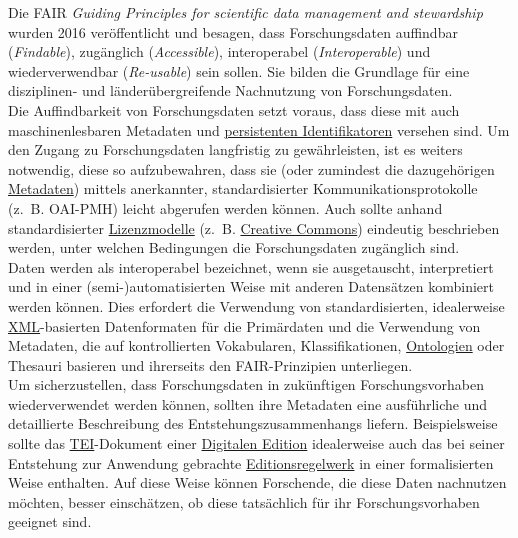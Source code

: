 \documentclass{article}
\begin{document}
    Die FAIR \emph{Guiding Principles for scientific data management and stewardship} wurden 2016 veröffentlicht und besagen, dass Forschungsdaten auffindbar (\emph{Findable}), zugänglich (\emph{Accessible}), interoperabel (\emph{Interoperable}) und wiederverwendbar (\emph{Re-usable}) sein sollen. Sie bilden die Grundlage für eine disziplinen- und länderübergreifende Nachnutzung von Forschungsdaten. \\
            
        Die Auffindbarkeit von Forschungsdaten setzt voraus, dass diese mit auch maschinenlesbaren Metadaten und \href{http://gams.uni-graz.at/o:konde.12}{persistenten Identifikatoren} versehen sind. Um den Zugang zu Forschungsdaten langfristig zu gewährleisten, ist es weiters notwendig, diese so aufzubewahren, dass sie (oder zumindest die dazugehörigen \href{http://gams.uni-graz.at/o:konde.25}{Metadaten}) mittels anerkannter, standardisierter Kommunikationsprotokolle (z. B. OAI-PMH) leicht abgerufen werden können. Auch sollte anhand standardisierter \href{http://gams.uni-graz.at/o:konde.9}{Lizenzmodelle} (z. B. \href{http://gams.uni-graz.at/o:konde.45}{Creative Commons}) eindeutig beschrieben werden, unter welchen Bedingungen die Forschungsdaten zugänglich sind. \\
            
        Daten werden als interoperabel bezeichnet, wenn sie ausgetauscht, interpretiert und in einer (semi-)automatisierten Weise mit anderen Datensätzen kombiniert werden können. Dies erfordert die Verwendung von standardisierten, idealerweise \href{http://gams.uni-graz.at/o:konde.215}{XML}-basierten Datenformaten für die Primärdaten und die Verwendung von Metadaten, die auf kontrollierten Vokabularen, Klassifikationen, \href{http://gams.uni-graz.at/o:konde.151}{Ontologien} oder Thesauri basieren und ihrerseits den FAIR-Prinzipien unterliegen.\\
            
        Um sicherzustellen, dass Forschungsdaten in zukünftigen Forschungsvorhaben wiederverwendet werden können, sollten ihre Metadaten eine ausführliche und detaillierte Beschreibung des Entstehungszusammenhangs liefern. Beispielsweise sollte das \href{http://gams.uni-graz.at/o:konde.178}{TEI}-Dokument einer \href{http://gams.uni-graz.at/o:konde.59}{Digitalen Edition} idealerweise auch das bei seiner Entstehung zur Anwendung gebrachte \href{http://gams.uni-graz.at/o:konde.198}{Editionsregelwerk} in einer formalisierten Weise enthalten. Auf diese Weise können Forschende, die diese Daten nachnutzen möchten, besser einschätzen, ob diese tatsächlich für ihr Forschungsvorhaben geeignet sind. \\
            
\end{document}
